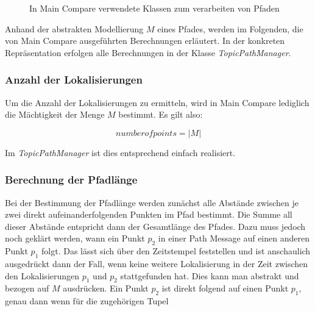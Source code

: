 \begin{figure}[t]
  \begin{center}
  \end{center}
  \caption{In Main Compare verwendete Klassen zum verarbeiten von Pfaden}
  \label{fig:topicpathrelated}
\end{figure}

Anhand der abstrakten Modellierung $M$ eines Pfades, werden im Folgenden, die von
Main Compare ausgeführten Berechnungen erläutert. In der konkreten
Repräsentation erfolgen alle Berechnungen in der Klasse \textit{TopicPathManager}. 

\subsubsection{Anzahl der Lokalisierungen}
Um die Anzahl der Lokalisierungen zu ermitteln, wird in Main Compare lediglich die
Mächtigkeit der Menge $M$ bestimmt. Es gilt also:

\begin{equation*}
  \label{eqn:numofpoints}
  number of points = \vert M \vert
\end{equation*}

Im \textit{TopicPathManager} ist dies entsprechend einfach realisiert.

\subsubsection{Berechnung der Pfadlänge}
Bei der Bestimmung der Pfadlänge werden zunächst alle Abstände zwischen je
zwei direkt aufeinanderfolgenden Punkten im Pfad bestimmt. Die Summe all dieser
Abstände entspricht dann der Gesamtlänge des Pfades. Dazu muss jedoch noch
geklärt werden, wann ein Punkt $p_2$ in einer Path Message auf einen anderen
Punkt $p_1$ folgt. Das lässt sich über den Zeitstempel feststellen und ist
anschaulich ausgedrückt dann der Fall, wenn keine weitere Lokalisierung in
der Zeit zwischen den Lokalisierungen $p_1$ und $p_2$ stattgefunden hat. Dies
kann man abstrakt und bezogen auf $M$ ausdrücken.  Ein Punkt $p_2$ ist direkt
folgend auf einen Punkt $p_1$, genau dann wenn für die zugehörigen Tupel

